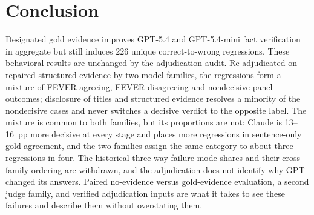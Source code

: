 \section{Conclusion}
\label{sec:conclusion}

Designated gold evidence improves GPT-5.4 and GPT-5.4-mini fact verification in aggregate but still induces 226 unique correct-to-wrong regressions.
These behavioral results are unchanged by the adjudication audit.
Re-adjudicated on repaired structured evidence by two model families, the regressions form a mixture of FEVER-agreeing, FEVER-disagreeing and nondecisive panel outcomes; disclosure of titles and structured evidence resolves a minority of the nondecisive cases and never switches a decisive verdict to the opposite label.
The mixture is common to both families, but its proportions are not: Claude is 13--16~pp more decisive at every stage and places more regressions in sentence-only gold agreement, and the two families assign the same category to about three regressions in four.
The historical three-way failure-mode shares and their cross-family ordering are withdrawn, and the adjudication does not identify why GPT changed its answers.
Paired no-evidence versus gold-evidence evaluation, a second judge family, and verified adjudication inputs are what it takes to see these failures and describe them without overstating them.
